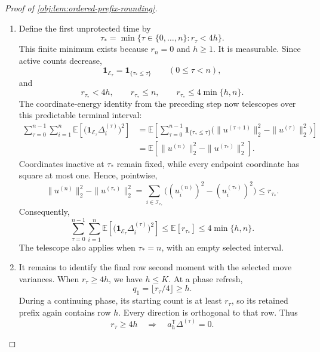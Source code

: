 \begin{proof}[Proof of \cref{obj:lem:ordered-prefix-rounding}]
\begin{enumerate}
\item
Define the first unprotected time by
\[
\tau_*=\min\{\tau\in\{0,\ldots,n\}:r_\tau<4h\}.
\]
This finite minimum exists because \(r_n=0\) and \(h\geq1\). It is measurable. Since active counts decrease,
\[
\mathbf1_{\mathcal E_\tau}
=\mathbf1_{\{\tau_*\leq\tau\}}
\qquad(0\leq\tau<n),
\]
and
\[
r_{\tau_*}<4h,\qquad
r_{\tau_*}\leq n,\qquad
r_{\tau_*}\leq4\min\{h,n\}.
\]
The coordinate-energy identity from the preceding step now telescopes over this predictable terminal interval:
\[
\begin{aligned}
\sum_{\tau=0}^{n-1}\sum_{i=1}^n
\mathbb E\!\left[
\bigl(\mathbf1_{\mathcal E_\tau}\Delta_i^{(\tau)}\bigr)^2
\right]
&=
\mathbb E\!\left[
\sum_{\tau=0}^{n-1}
\mathbf1_{\{\tau_*\leq\tau\}}
\bigl(\|u^{(\tau+1)}\|_2^2-\|u^{(\tau)}\|_2^2\bigr)
\right]\\
&=
\mathbb E\!\left[\|u^{(n)}\|_2^2-\|u^{(\tau_*)}\|_2^2\right].
\end{aligned}
\]
Coordinates inactive at \(\tau_*\) remain fixed, while every endpoint coordinate has square at most one. Hence, pointwise,
\[
\|u^{(n)}\|_2^2-\|u^{(\tau_*)}\|_2^2
=
\sum_{i\in\mathcal I_{\tau_*}}
\bigl((u_i^{(n)})^2-(u_i^{(\tau_*)})^2\bigr)
\leq r_{\tau_*}.
\]
Consequently,
\[
\sum_{\tau=0}^{n-1}\sum_{i=1}^n
\mathbb E\!\left[
\bigl(\mathbf1_{\mathcal E_\tau}\Delta_i^{(\tau)}\bigr)^2
\right]
\leq\mathbb E[r_{\tau_*}]
\leq4\min\{h,n\}.
\]
The telescope also applies when \(\tau_*=n\), with an empty selected interval.

\item
It remains to identify the final row second moment with the selected move variances. When \(r_\tau\geq4h\), we have \(h\leq K\). At a phase refresh,
\[
q_1=\lfloor r_\tau/4\rfloor\geq h.
\]
During a continuing phase, its starting count is at least \(r_\tau\), so its retained prefix again contains row \(h\). Every direction is orthogonal to that row. Thus
\[
r_\tau\geq4h
\quad\Longrightarrow\quad
a_h^{\mathsf T}\Delta^{(\tau)}=0.
\]


\end{enumerate}
\end{proof}
